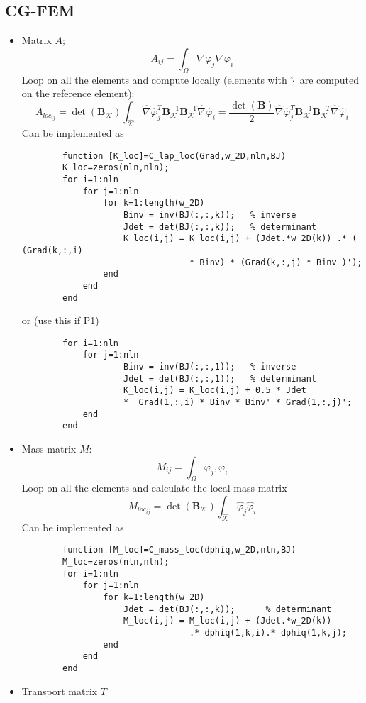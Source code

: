 \documentclass[a4paper,11pt]{article}
\theoremstyle{break}
\renewcommand*{\grad}{\nabla\mspace{1mu}}
\newcommand{\vect}[1]{\textbf{#1}}
\let\phi\varphi
\newcommand{\element}{\mathcal{K}}
\numberwithin{equation}{section}
\begin{document}
\subsection*{CG-FEM}
\begin{itemize}
    \item Matrix \(A\);
    \[
        A_{ij} = \int_\Omega \grad \phi_j \grad \phi_i  
    \]
    Loop on all the elements and compute locally (elements with \(\hat{\cdot}\) are computed on the reference element):
    \[
        A_{loc_{ij}} = \det(\vect{B}_\element) \int_{\hat{\element}} \hat{\grad} \hat{\phi}^T_j \vect{B}_\element^{-1} \vect{B}^{-1}_\element \hat{\grad} \hat{\phi}_i = \frac{\det(\vect{B})}{2} \hat{\grad} \hat{\phi}^T_j \vect{B}_\element^{-1} \vect{B}^{-T}_\element \hat{\grad} \hat{\phi}_i
    \]
    Can be implemented as 
    \begin{verbatim}
        function [K_loc]=C_lap_loc(Grad,w_2D,nln,BJ)
        K_loc=zeros(nln,nln);
        for i=1:nln
            for j=1:nln
                for k=1:length(w_2D)
                    Binv = inv(BJ(:,:,k));   % inverse
                    Jdet = det(BJ(:,:,k));   % determinant 
                    K_loc(i,j) = K_loc(i,j) + (Jdet.*w_2D(k)) .* ( (Grad(k,:,i)
                                 * Binv) * (Grad(k,:,j) * Binv )');
                end
            end
        end
    \end{verbatim}
    or (use this if P1)
    \begin{verbatim}
        for i=1:nln
            for j=1:nln
                    Binv = inv(BJ(:,:,1));   % inverse
                    Jdet = det(BJ(:,:,1));   % determinant 
                    K_loc(i,j) = K_loc(i,j) + 0.5 * Jdet 
                    *  Grad(1,:,i) * Binv * Binv' * Grad(1,:,j)';
            end
        end
    \end{verbatim}
    \item Mass matrix \(M\):
    \[
        M_{ij} = \int_\Omega \phi_j, \phi_i
    \]
    Loop on all the elements and calculate the local mass matrix
    \[
        M_{loc_{ij}} =  \det(\vect{B}_\element) \int_{\hat{\element}} \hat{\phi}_j \hat{\phi}_i
    \]
    Can be implemented as
    \begin{verbatim}
        function [M_loc]=C_mass_loc(dphiq,w_2D,nln,BJ)
        M_loc=zeros(nln,nln);
        for i=1:nln
            for j=1:nln
                for k=1:length(w_2D)
                    Jdet = det(BJ(:,:,k));      % determinant 
                    M_loc(i,j) = M_loc(i,j) + (Jdet.*w_2D(k))
                                 .* dphiq(1,k,i).* dphiq(1,k,j);
                end
            end
        end
    \end{verbatim}
    \item Transport matrix \(T\)
    

\end{itemize}
\end{document}
